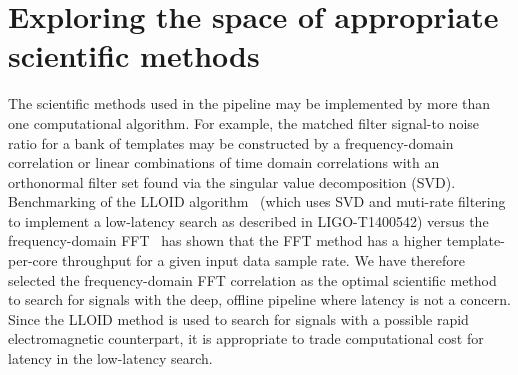 




\section{Exploring the space of appropriate scientific methods}
\vspace*{-5pt}
\label{sec:MethodSpace}

The scientific methods used in the pipeline may be implemented by more than one computational
algorithm. For example, the matched filter signal-to noise ratio for a bank of
templates may be constructed by a frequency-domain correlation or linear
combinations of time domain correlations with an orthonormal filter set found
via the singular value decomposition (SVD).  Benchmarking of the LLOID
algorithm~\cite{Cannon:2011vi} (which uses SVD and muti-rate filtering to implement a low-latency
search as described in LIGO-T1400542) versus the frequency-domain FFT~\cite{Allen:2005fk}
has shown that the FFT method has a higher
template-per-core throughput for a given input data sample rate.   We have
therefore selected the frequency-domain FFT correlation as the optimal
scientific method to search for signals with the deep, offline pipeline where
latency is not a concern. Since the LLOID method is used to search for signals with a
possible rapid electromagnetic counterpart, it is appropriate to trade
computational cost for latency in the low-latency search.

